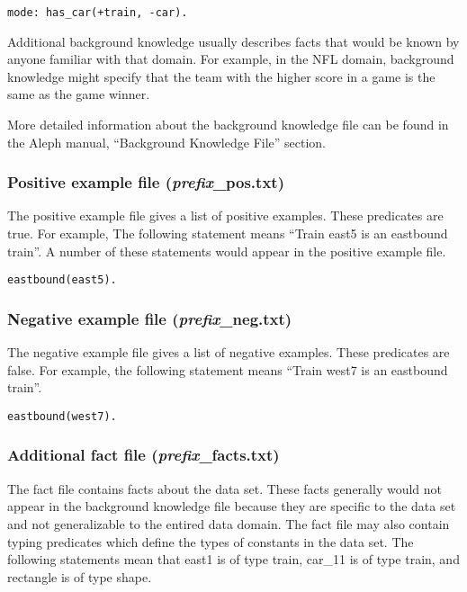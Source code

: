 \documentclass{article}
\begin{document}
\begin{verbatim}
mode: has_car(+train, -car).
\end{verbatim}

Additional background knowledge usually describes facts that would be known by anyone familiar with that domain.  For example, in the NFL domain, background knowledge might specify that the team with the higher score in a game is the same as the game winner.

More detailed information about the background knowledge file can be found in the Aleph manual, ``Background Knowledge File'' section.~\cite{alephbkfile}


\subsubsection{Positive example file (\emph{prefix}\_pos.txt)}

The positive example file gives a list of positive examples.  These predicates are true. For example, The following statement means ``Train east5 is an eastbound train''.  A number of these statements would appear in the positive example file.

\begin{verbatim}
eastbound(east5).
\end{verbatim}

\subsubsection{Negative example file (\emph{prefix}\_neg.txt)}

The negative example file gives a list of negative examples.  These predicates are false. For example, the following statement means ``Train west7 is an eastbound train''.

\begin{verbatim}
eastbound(west7).
\end{verbatim}

\subsubsection{Additional fact file (\emph{prefix}\_facts.txt)}

The fact file contains facts about the data set.  These facts generally would not appear in the background knowledge file because they are specific to the data set and not generalizable to the entired data domain.  The fact file may also contain typing predicates which define the types of constants in the data set.  The following statements mean that east1 is of type train, car_11 is of type train, and rectangle is of type shape.
\end{document}

